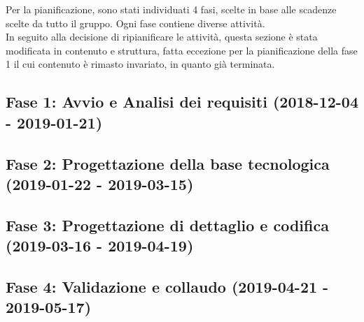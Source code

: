 Per la pianificazione, sono stati individuati 4 fasi, scelte in base alle scadenze scelte da tutto il gruppo. Ogni fase contiene diverse attività.\\

In seguito alla decisione di ripianificare le attività, questa sezione è stata modificata in contenuto e struttura, fatta eccezione per la pianificazione della fase 1 il cui contenuto è rimasto invariato, in quanto già terminata.
\subsection{Fase 1: Avvio e Analisi dei requisiti (2018-12-04 - 2019-01-21)}
	

\subsection{Fase 2: Progettazione della base tecnologica (2019-01-22 - 2019-03-15)}	
	
	
\subsection{Fase 3: Progettazione di dettaglio e codifica (2019-03-16 - 2019-04-19)}
	
	
\subsection{Fase 4: Validazione e collaudo (2019-04-21 - 2019-05-17)}
	
	
\newpage